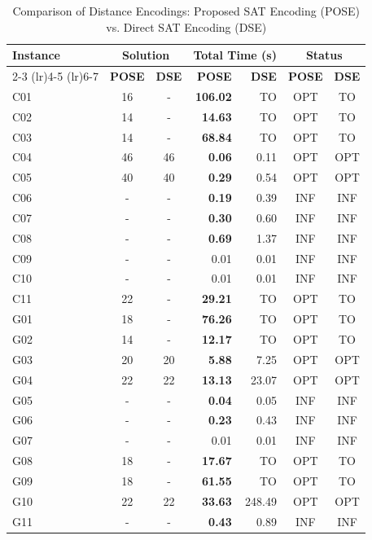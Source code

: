 \documentclass[letterpaper,journal]{IEEEtran}
\begin{document}
\begin{table}[htbp]
\centering
\caption{Comparison of Distance Encodings: Proposed SAT Encoding (POSE) vs. Direct SAT Encoding (DSE)}
\label{tab:pose_vs_dse}
\begin{tabular}{l c c r r c c}
\toprule
\textbf{Instance} & \multicolumn{2}{c}{\textbf{Solution}} & \multicolumn{2}{c}{\textbf{Total Time (s)}} & \multicolumn{2}{c}{\textbf{Status}} \\
\cmidrule(lr){2-3} \cmidrule(lr){4-5} \cmidrule(lr){6-7}
 & \textbf{POSE} & \textbf{DSE} & \textbf{POSE} & \textbf{DSE} & \textbf{POSE} & \textbf{DSE} \\
\midrule
C01 & 16 & - & \textbf{106.02} & TO & OPT & TO \\
C02 & 14 & - & \textbf{14.63} & TO & OPT & TO \\
C03 & 14 & - & \textbf{68.84} & TO & OPT & TO \\
C04 & 46 & 46 & \textbf{0.06} & 0.11 & OPT & OPT \\
C05 & 40 & 40 & \textbf{0.29} & 0.54 & OPT & OPT \\
C06 & - & - & \textbf{0.19} & 0.39 & INF & INF \\
C07 & - & - & \textbf{0.30} & 0.60 & INF & INF \\
C08 & - & - & \textbf{0.69} & 1.37 & INF & INF \\
C09 & - & - & 0.01 & 0.01 & INF & INF \\
C10 & - & - & 0.01 & 0.01 & INF & INF \\
C11 & 22 & - & \textbf{29.21} & TO & OPT & TO \\
G01 & 18 & - & \textbf{76.26} & TO & OPT & TO \\
G02 & 14 & - & \textbf{12.17} & TO & OPT & TO \\
G03 & 20 & 20 & \textbf{5.88} & 7.25 & OPT & OPT \\
G04 & 22 & 22 & \textbf{13.13} & 23.07 & OPT & OPT \\
G05 & - & - & \textbf{0.04} & 0.05 & INF & INF \\
G06 & - & - & \textbf{0.23} & 0.43 & INF & INF \\
G07 & - & - & 0.01 & 0.01 & INF & INF \\
G08 & 18 & - & \textbf{17.67} & TO & OPT & TO \\
G09 & 18 & - & \textbf{61.55} & TO & OPT & TO \\
G10 & 22 & 22 & \textbf{33.63} & 248.49 & OPT & OPT \\
G11 & - & - & \textbf{0.43} & 0.89 & INF & INF \\

\end{tabular}
\end{table}
\end{document}
